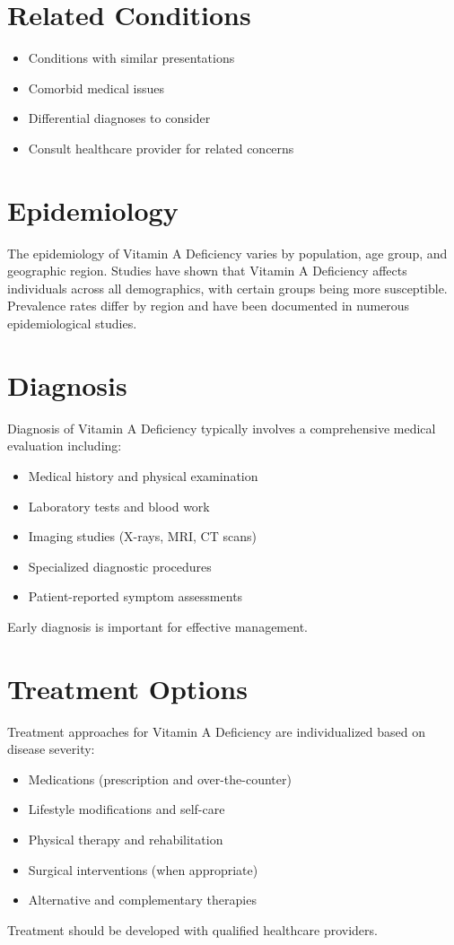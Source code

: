 \section*{Related Conditions}
\begin{itemize}
  \item Conditions with similar presentations
  \item Comorbid medical issues
  \item Differential diagnoses to consider
  \item Consult healthcare provider for related concerns
\end{itemize}

\section*{Epidemiology}
The epidemiology of Vitamin A Deficiency varies by population, age group, and geographic region. Studies have shown that Vitamin A Deficiency affects individuals across all demographics, with certain groups being more susceptible. Prevalence rates differ by region and have been documented in numerous epidemiological studies.

\section*{Diagnosis}
Diagnosis of Vitamin A Deficiency typically involves a comprehensive medical evaluation including:
\begin{itemize}
  \item Medical history and physical examination
  \item Laboratory tests and blood work
  \item Imaging studies (X-rays, MRI, CT scans)
  \item Specialized diagnostic procedures
  \item Patient-reported symptom assessments
\end{itemize}
Early diagnosis is important for effective management.

\section*{Treatment Options}
Treatment approaches for Vitamin A Deficiency are individualized based on disease severity:
\begin{itemize}
  \item Medications (prescription and over-the-counter)
  \item Lifestyle modifications and self-care
  \item Physical therapy and rehabilitation
  \item Surgical interventions (when appropriate)
  \item Alternative and complementary therapies
\end{itemize}
Treatment should be developed with qualified healthcare providers.

